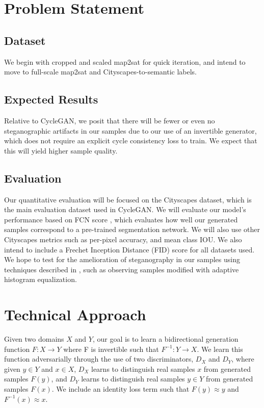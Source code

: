 \documentclass{article}
\begin{document}
\section{Problem Statement}
\subsection{Dataset}
We begin with cropped and scaled map2sat for quick iteration, and intend to move to full-scale map2sat and Cityscapes-to-semantic labels.

\subsection{Expected Results}
Relative to CycleGAN, we posit that there will be fewer or even no steganographic artifacts in our samples due to our use of an invertible generator, which does not require an explicit cycle consistency loss to train. We expect that this will yield higher sample quality. 
\subsection{Evaluation}
Our quantitative evaluation will be focused on the Cityscapes dataset, which is the main evaluation dataset used in CycleGAN. We will evaluate our model's performance based on FCN score \citep{isola2017image}, which evaluates how well our generated samples correspond to a pre-trained segmentation network. We will also use other Cityscapes metrics such as per-pixel accuracy, and mean class IOU. We also intend to include a Frechet Inception Distance (FID) score \citep{heusel2017gans} for all datasets used. We hope to test for the amelioration of steganography in our samples using techniques described in  \citep{chu2017cyclegan}, such as observing samples modified with adaptive histogram equalization. 
\section{Technical Approach}
Given two domains $X$ and $Y$, our goal is to learn a bidirectional generation function $F: X \rightarrow Y$ where F is invertible such that $F^{-1}: Y \rightarrow X$. We learn this function adversarially through the use of two discriminators, $D_X$ and $D_Y$, where given  $y \in Y$ and $x \in X$, $D_X$ learns to distinguish real samples $x$ from generated samples $F(y)$, and $D_Y$ learns to distinguish real samples $y \in Y$ from generated samples $F(x)$. We include an identity loss term such that $F(y) \approx y$ and $F^{-1}(x) \approx x$.
\end{document}
